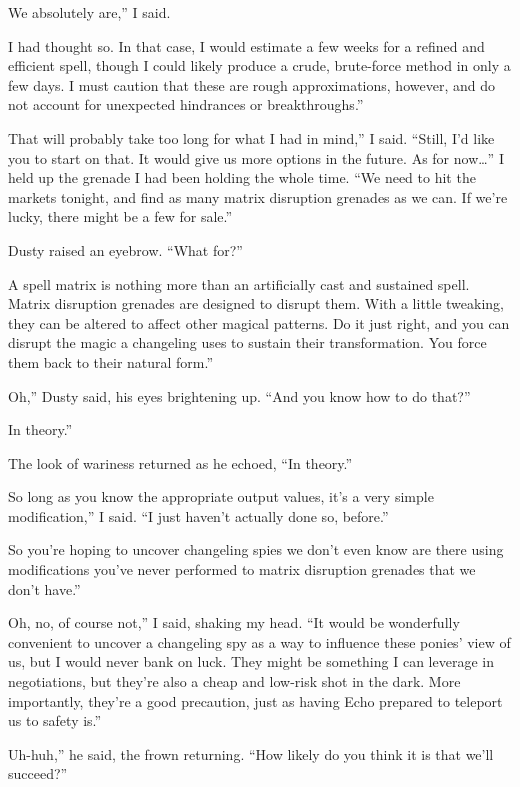 \leavevmode{}We absolutely are,” I said.

\leavevmode{}I had thought so. In that case, I would estimate a few weeks for a refined and efficient spell, though I could likely produce a crude, brute-force method in only a few days. I must caution that these are rough approximations, however, and do not account for unexpected hindrances or breakthroughs.”

\leavevmode{}That will probably take too long for what I had in mind,” I said. “Still, I’d like you to start on that. It would give us more options in the future. As for now…” I held up the grenade I had been holding the whole time. “We need to hit the markets tonight, and find as many matrix disruption grenades as we can. If we’re lucky, there might be a few for sale.”

Dusty raised an eyebrow. “What for?”

\leavevmode{}A spell matrix is nothing more than an artificially cast and sustained spell. Matrix disruption grenades are designed to disrupt them. With a little tweaking, they can be altered to affect other magical patterns. Do it just right, and you can disrupt the magic a changeling uses to sustain their transformation. You force them back to their natural form.”

\leavevmode{}Oh,” Dusty said, his eyes brightening up. “And you know how to do that?”

\leavevmode{}In theory.”

The look of wariness returned as he echoed, “In theory.”

\leavevmode{}So long as you know the appropriate output values, it’s a very simple modification,” I said. “I just haven’t actually done so, before.”

\leavevmode{}So you’re hoping to uncover changeling spies we don’t even know are there using modifications you’ve never performed to matrix disruption grenades that we don’t have.”

\leavevmode{}Oh, no, of course not,” I said, shaking my head. “It would be wonderfully convenient to uncover a changeling spy as a way to influence these ponies’ view of us, but I would never bank on luck. They might be something I can leverage in negotiations, but they’re also a cheap and low-risk shot in the dark. More importantly, they’re a good precaution, just as having Echo prepared to teleport us to safety is.”

\leavevmode{}Uh-huh,” he said, the frown returning. “How likely do you think it is that we’ll succeed?”

